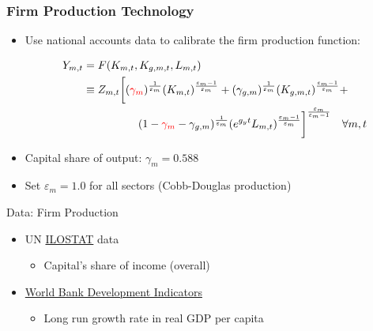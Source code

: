 \documentclass{beamer}
\begin{document}
\begin{frame}
  \frametitle{Firm Production Technology}
  \begin{itemize}
      \item Use national accounts data to calibrate the firm production function:

      \begin{equation*}
        \begin{split}
          Y_{m,t} &= F(K_{m,t}, K_{g,m,t}, L_{m,t}) \\
          &\equiv Z_{m,t}\biggl[(\textcolor{red}{\gamma_m})^\frac{1}{\varepsilon_m}(K_{m,t})^\frac{\varepsilon_m-1}{\varepsilon_m} + (\gamma_{g,m})^\frac{1}{\varepsilon_m}(K_{g,m,t})^\frac{\varepsilon_m-1}{\varepsilon_m} + \\
          &\quad\quad\quad\quad\quad(1-\textcolor{red}{\gamma_m}-\gamma_{g,m})^\frac{1}{\varepsilon_m}(e^{g_y t}L_{m,t})^\frac{\varepsilon_m-1}{\varepsilon_m}\biggr]^\frac{\varepsilon_m}{\varepsilon_m-1} \quad\forall m,t
        \end{split}
      \end{equation*}
      \item Capital share of output: $\gamma_m = 0.588$

      \item Set $\varepsilon_m = 1.0$ for all sectors (Cobb-Douglas production)
  \end{itemize}
\end{frame}


\begin{frame}{Data: Firm Production}
  \begin{itemize}
    \item UN \href{https://ilostat.ilo.org}{ILOSTAT} data
      \begin{itemize}
        \item Capital's share of income (overall)
      \end{itemize}
    \item \href{https://databank.worldbank.org/source/world-development-indicators}{World Bank Development Indicators}
      \begin{itemize}
        \item Long run growth rate in real GDP per capita
      \end{itemize}
  \end{itemize}
  \end{frame}
\end{document}
